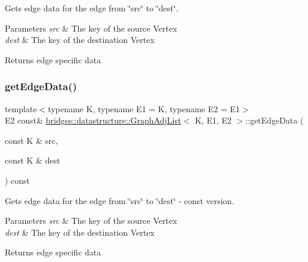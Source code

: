 Gets edge data for the edge from \char`\"{}src\char`\"{} to \char`\"{}dest\char`\"{}. 


\begin{DoxyParams}{Parameters}
{\em src} & The key of the source Vertex \\
\hline
{\em dest} & The key of the destination Vertex\\
\hline
\end{DoxyParams}
\begin{DoxyReturn}{Returns}
edge specific data 
\end{DoxyReturn}
\mbox{\label{classbridges_1_1datastructure_1_1_graph_adj_list_a5c2cdffda7c983c3141ae36acc2b698d}} 
\subsubsection{\texorpdfstring{get\+Edge\+Data()}{getEdgeData()}\hspace{0.1cm}{\footnotesize\ttfamily [2/2]}}
{\footnotesize\ttfamily template$<$typename K, typename E1 = K, typename E2 = E1$>$ \\
E2 const\& \hyperlink{classbridges_1_1datastructure_1_1_graph_adj_list}{bridges\+::datastructure\+::\+Graph\+Adj\+List}$<$ K, E1, E2 $>$\+::get\+Edge\+Data (\begin{DoxyParamCaption}\item[{const K \&}]{src,  }\item[{const K \&}]{dest }\end{DoxyParamCaption}) const\hspace{0.3cm}{\ttfamily [inline]}}



Gets edge data for the edge from \char`\"{}src\char`\"{} to \char`\"{}dest\char`\"{} -\/ const version. 


\begin{DoxyParams}{Parameters}
{\em src} & The key of the source Vertex \\
\hline
{\em dest} & The key of the destination Vertex\\
\hline
\end{DoxyParams}
\begin{DoxyReturn}{Returns}
edge specific data 
\end{DoxyReturn}
\mbox{\label{classbridges_1_1datastructure_1_1_graph_adj_list_ae36ba10fae403339df0c36707ed13536}} 
